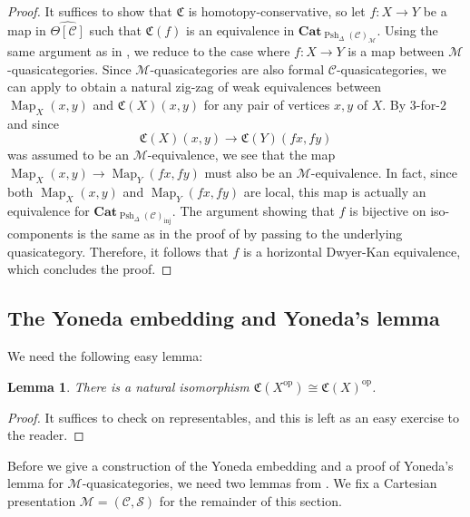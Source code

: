 \documentclass[leqno]{article}
\numberwithin{equation}{subsection}
\theoremstyle{plain}   %
\newtheorem{lemma}[equation]{Lemma}
\theoremstyle{remark}
\theoremstyle{plain}
\newcommand{\op}{\ensuremath{\mathrm{op}}}
\newcommand{\Cat}{\ensuremath{\mathbf{Cat}}}
\DeclareMathOperator{\Map}{Map}
\providecommand{\C}{}
\renewcommand{\C}{\ensuremath{\mathcal{C}}}
\newcommand{\M}{\ensuremath{\mathcal{M}}}
\newcommand{\setS}{\ensuremath{\mathscr{S}}}
\newcommand{\cellset}{\ensuremath{\widehat{\Theta[\mathcal{C}]}}}
\newcommand{\spsh}{\ensuremath{\operatorname{Psh}_\Delta(\mathcal{C})}}
\begin{document}
\begin{proof} It suffices to show that \(\mathfrak{C}\) is homotopy-conservative, so let \(f:X\to Y\) be a map in \(\cellset\) such that \(\mathfrak{C}(f)\) is an equivalence in \(\Cat_{\spsh_{\M}}\). Using the same argument as in , we reduce to the case where \(f:X\to Y\) is a map between \(\M\)-quasicategories.  Since \(\M\)-quasicategories are also formal \(\C\)-quasicategories, we can apply  to obtain a natural zig-zag of weak equivalences between \(\Map_X(x,y)\) and \(\mathfrak{C}(X)(x,y)\) for any pair of vertices \(x,y\) of \(X\).  By \(3\)-for-\(2\) and since \[\mathfrak{C}(X)(x,y) \to \mathfrak{C}(Y)(fx,fy)\] was assumed to be an \(\M\)-equivalence, we see that the map \(\Map_X(x,y)\to \Map_Y(fx,fy)\) must also be an \(\M\)-equivalence.  In fact, since both \(\Map_X(x,y)\) and \(\Map_Y(fx,fy)\) are local, this map is actually an equivalence for \(\Cat_{\spsh_{\mathrm{inj}}}\).  The argument showing that \(f\) is bijective on iso-components is the same as in the proof of  by passing to the underlying quasicategory.  Therefore, it follows that \(f\) is a horizontal Dwyer-Kan equivalence, which concludes the proof.
\end{proof}
\subsection{The Yoneda embedding and Yoneda's lemma}
We need the following easy lemma:
\begin{lemma} There is a natural isomorphism \(\mathfrak{C}(X^\op)\cong \mathfrak{C}(X)^\op\).  
\end{lemma} 
\begin{proof}
	It suffices to check on representables, and this is left as an easy exercise to the reader.
\end{proof}
Before we give a construction of the Yoneda embedding and a proof of Yoneda's lemma for \(\M\)-quasicategories, we need two lemmas from \cite{htt}.   We fix a Cartesian presentation \(\mathcal{M}=(\C,\setS)\) for the remainder of this section.
\end{document}
